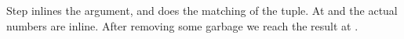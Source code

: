 \documentclass[acmsmall,review,anonymous,dvipsnames]{acmart}
\newcommand{\Varid}[1]{\mathit{#1}}
\begin{document}
Step  inlines the argument, and  does the matching of the tuple.
At  and  the actual numbers are inline.
After removing some garbage we reach the result at .
\begin{figure}
\end{figure}
\end{document}
